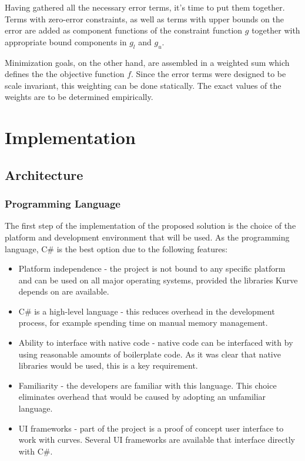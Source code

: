 \documentclass[a4paper]{article}
\begin{document}
				Having gathered all the necessary error terms, it's time to put them together. Terms with zero-error constraints, as well as terms with upper bounds on the error are added as component functions of the constraint function \(g\) together with appropriate bound components in \(g_l\) and \(g_u\).

				Minimization goals, on the other hand, are assembled in a weighted sum which defines the the objective function \(f\). Since the error terms were designed to be scale invariant, this weighting can be done statically. The exact values of the weights are to be determined empirically.

	\section{Implementation}

		\subsection{Architecture}
			
			\subsubsection{Programming Language}
			
				The first step of the implementation of the proposed solution is the choice of the platform and development environment that will be used. 
				As the programming language, C\# is the best option due to the following features:
				
				\begin{itemize}
				  	\item Platform independence - the project is not bound to any specific platform and can be used on all major operating systems, provided the libraries Kurve depends on are available. 
				  	\item C\# is a high-level language - this reduces overhead in the development process, for example spending time on manual memory management.
					\item Ability to interface with native code - native code can be interfaced with by using reasonable amounts of boilerplate code. As it was clear that native libraries would be used, this is a key requirement.
					\item Familiarity - the developers are familiar with this language. This choice eliminates overhead that would be caused by adopting an unfamiliar language.
					\item UI frameworks - part of the project is a proof of concept user interface to work with curves. Several UI frameworks are available that interface directly with C\#.
				\end{itemize}
			
\end{document}
